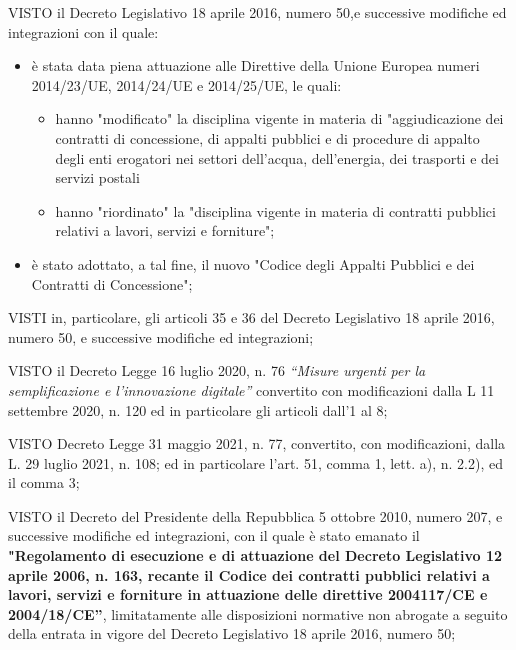 \begin{list}{VALUTATA}{}
\item[VISTO]
il Decreto Legislativo 18 aprile 2016, numero 50,e successive modifiche ed integrazioni  con il quale: 
\begin{itemize}
\item è stata data piena attuazione alle Direttive della Unione Europea numeri 2014/23/UE, 2014/24/UE
e 2014/25/UE, le quali:
\begin{itemize}
\item hanno "modificato" la disciplina vigente in materia di "aggiudicazione dei contratti di concessione,
di appalti pubblici e di procedure di appalto degli enti erogatori nei settori dell'acqua, dell'energia,
dei trasporti e dei servizi postali 
\item hanno  "riordinato" la "disciplina vigente in materia di contratti pubblici relativi a lavori, servizi
e forniture";
\end{itemize}
\item è stato adottato, a tal fine, il nuovo  "Codice  degli  Appalti  Pubblici e dei Contratti di Concessione";
\end{itemize}

\item[VISTI]
in, particolare, gli articoli 35 e 36 del Decreto Legislativo 18 aprile 2016, numero 50, e successive modifiche
ed integrazioni;

\item[VISTO]
il Decreto Legge 16 luglio 2020, n. 76 \textit{“Misure urgenti per la semplificazione e l'innovazione digitale”}
convertito con modificazioni dalla L 11 settembre 2020, n. 120 ed in particolare gli articoli dall’1 al 8;

\item[VISTO]
Decreto Legge 31 maggio 2021, n. 77, convertito, con modificazioni, dalla L. 29 luglio 2021, n. 108;
ed in particolare l'art. 51, comma 1, lett. a), n. 2.2), ed il comma 3;

\item[VISTO]
il Decreto del Presidente della Repubblica 5 ottobre 2010, numero 207, e successive modifiche ed integrazioni,
con il quale è stato emanato il \textbf{"Regolamento di esecuzione  e  di  attuazione  del Decreto Legislativo
12 aprile 2006, n. 163, recante il Codice dei contratti pubblici relativi a lavori, servizi e forniture in
attuazione delle direttive 2004117/CE e 2004/18/CE''}, limitatamente alle disposizioni normative non abrogate
a seguito della entrata in vigore del Decreto Legislativo 18 aprile 2016, numero 50;


\end{list}
